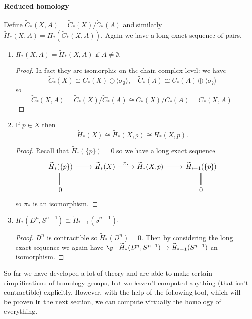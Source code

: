 \documentclass[a4paper]{article}
\renewcommand{\b}{\p}
\begin{document}
\paragraph{Reduced homology}

Define \(\widetilde C_*(X, A) = \widetilde C_*(X)/\widetilde C_*(A)\) and similarly \(\widetilde H_*(X, A) = H_*(\widetilde C_*(X, A))\). Again we have a long exact sequence of pairs.

\begin{eg}\leavevmode
  \begin{enumerate}
  \item \(H_*(X, A) = \widetilde H_*(X, A)\) if \(A \neq \emptyset\).
    \begin{proof}
      In fact they are isomorphic on the chain complex level: we have
      \[
        \widetilde C_*(X) \cong C_*(X) \oplus \langle \sigma_\emptyset \rangle, \quad
        \widetilde C_*(A) \cong C_*(A) \oplus \langle \sigma_\emptyset \rangle
      \]
      so
      \[
        \widetilde C_*(X, A) = \widetilde C_*(X)/\widetilde C_*(A) \cong C_*(X)/C_*(A) = C_*(X, A).
      \]
    \end{proof}
  \item If \(p \in X\) then
    \[
      \widetilde H_*(X) \cong \widetilde H_*(X, p) \cong H_*(X, p).
    \]
    \begin{proof}
      Recall that \(\widetilde H_*(\{p\}) = 0\) so we have a long exact sequence
      \[
        \begin{tikzcd}
          \widetilde H_*(\{p\}) \ar[r] \ar[d, equal] & \widetilde H_*(X) \ar[r, "\pi_*"] & \widetilde H_*(X, p) \ar[r] & \widetilde H_{* - 1}(\{p\}) \ar[d, equal] \\
          0 & & & 0
        \end{tikzcd}
      \]
      so \(\pi_*\) is an isomorphism.
    \end{proof}
  \item \(H_*(D^n, S^{n - 1}) \cong \widetilde H_{* -1}(S^{n - 1})\).
    \begin{proof}
      \(D^n\) is contractible so \(\widetilde H_*(D^n) = 0\). Then by considering the long exact sequence we again have \(\b: \widetilde H_*(D^n, S^{n -1}) \to \widetilde H_{* - 1}(S^{n - 1})\) an isomorphism.
    \end{proof}
  \end{enumerate}
\end{eg}

So far we have developed a lot of theory and are able to make certain simplifications of homology groups, but we haven't computed anything (that isn't contractible) explicitly. However, with the help of the following tool, which will be proven in the next section, we can compute virtually the homology of everything.
\end{document}
